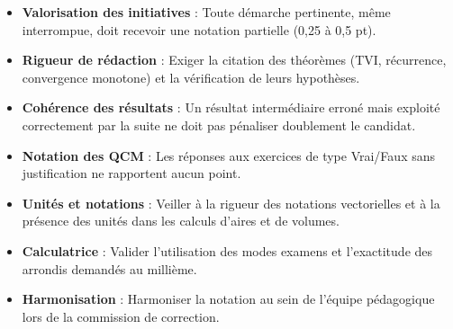 \documentclass[a4paper,11pt]{article}
\begin{document}
\vspace{0.08cm}
\begin{tcolorbox}[
    enhanced,
    colback=white,
    colframe=bleuprimaire,
    boxrule=0.7pt,
    leftrule=3.5pt,
    arc=1.5mm,
    title={\bfseries Consignes communes d'harmonisation (Règles d'or)},
    coltitle=bleuprimaire,
    colbacktitle=bleufond,
    titlerule=0.3pt,
    top=4pt, bottom=4pt, left=8pt, right=8pt
]
\small
\begin{itemize}[leftmargin=*, label=\textcolor{bleusecondaire}{\small\textbullet}, itemsep=8pt, topsep=1pt, parsep=0pt]
    \item \textbf{Valorisation des initiatives} : Toute démarche pertinente, même interrompue, doit recevoir une notation partielle (0,25 à 0,5 pt).
    \item \textbf{Rigueur de rédaction} : Exiger la citation des théorèmes (TVI, récurrence, convergence monotone) et la vérification de leurs hypothèses.
    \item \textbf{Cohérence des résultats} : Un résultat intermédiaire erroné mais exploité correctement par la suite ne doit pas pénaliser doublement le candidat.
    \item \textbf{Notation des QCM} : Les réponses aux exercices de type Vrai/Faux sans justification ne rapportent aucun point.
    \item \textbf{Unités et notations} : Veiller à la rigueur des notations vectorielles et à la présence des unités dans les calculs d'aires et de volumes.
    \item \textbf{Calculatrice} : Valider l'utilisation des modes examens et l'exactitude des arrondis demandés au millième.
    \item \textbf{Harmonisation} : Harmoniser la notation au sein de l'équipe pédagogique lors de la commission de correction.
\end{itemize}
\end{tcolorbox}
\end{document}
